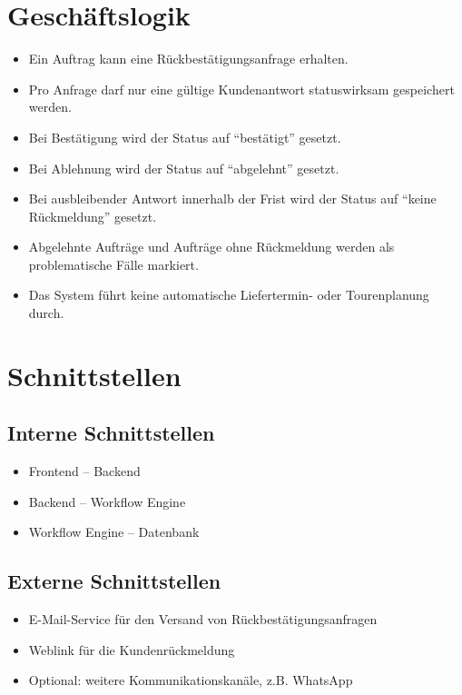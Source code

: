 \documentclass[12pt,a4paper]{article}
\begin{document}
\section{Geschäftslogik}
\begin{itemize}
    \item Ein Auftrag kann eine Rückbestätigungsanfrage erhalten.
    \item Pro Anfrage darf nur eine gültige Kundenantwort statuswirksam gespeichert werden.
    \item Bei Bestätigung wird der Status auf ``bestätigt'' gesetzt.
    \item Bei Ablehnung wird der Status auf ``abgelehnt'' gesetzt.
    \item Bei ausbleibender Antwort innerhalb der Frist wird der Status auf ``keine Rückmeldung'' gesetzt.
    \item Abgelehnte Aufträge und Aufträge ohne Rückmeldung werden als problematische Fälle markiert.
    \item Das System führt keine automatische Liefertermin- oder Tourenplanung durch.
\end{itemize}

\section{Schnittstellen}
\subsection{Interne Schnittstellen}
\begin{itemize}
    \item Frontend – Backend
    \item Backend – Workflow Engine
    \item Workflow Engine – Datenbank
\end{itemize}

\subsection{Externe Schnittstellen}
\begin{itemize}
    \item E-Mail-Service für den Versand von Rückbestätigungsanfragen
    \item Weblink für die Kundenrückmeldung
    \item Optional: weitere Kommunikationskanäle, z.B. WhatsApp
\end{itemize}
\end{document}
